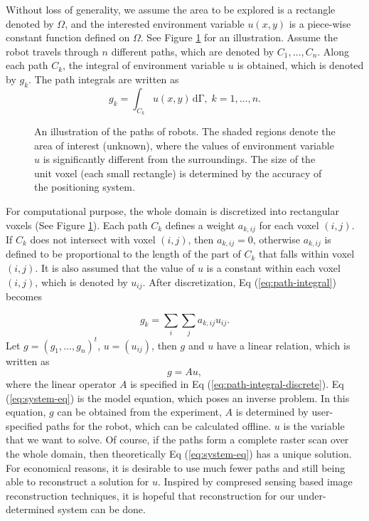 \documentclass[english]{article}\usepackage[]{graphicx}\usepackage[]{color}
\begin{document}
Without loss of generality, we assume the area to be explored is a
rectangle denoted by $\Omega$, and the interested environment variable
$u(x,y)$ is a piece-wise constant function defined on $\Omega$.
See Figure \ref{fig:An-illustration-of-paths} for an illustration.
Assume the robot travels through $n$ different paths, which are denoted
by $C_{1},\ldots,C_{n}$. Along each path $C_{k}$, the integral of
environment variable $u$ is obtained, which is denoted by $g_{k}$.
The path integrals are written as
\begin{equation}
g_{k}=\int_{C_{k}}u(x,y)\mathrm{\,{d}\Gamma},\; k=1,\ldots,n.\label{eq:path-integral}
\end{equation}


\begin{figure}[h]
\begin{centering}
\par\end{centering}

\caption{\label{fig:An-illustration-of-paths}An illustration of the paths
of robots. The shaded regions denote the area of interest (unknown),
where the values of environment variable $u$ is significantly different
from the surroundings. The size of the unit voxel (each small rectangle)
is determined by the accuracy of the positioning system.}
\end{figure}


For computational purpose, the whole domain is discretized into rectangular
voxels (See Figure \ref{fig:An-illustration-of-paths}). Each path
$C_{k}$ defines a weight $a_{k,ij}$ for each voxel $(i,j)$. If
$C_{k}$ does not intersect with voxel $(i,j)$, then $a_{k,ij}=0$,
otherwise $a_{k,ij}$ is defined to be proportional to the length
of the part of $C_{k}$ that falls within voxel $(i,j)$. It is also
assumed that the value of $u$ is a constant within each voxel $(i,j)$,
which is denoted by $u_{ij}$. After discretization, Eq (\ref{eq:path-integral})
becomes

\begin{equation}
g_{k}=\sum_{i}\sum_{j}a_{k,ij}u_{ij}.\label{eq:path-integral-discrete}
\end{equation}
Let $g=(g_{1},\ldots,g_{n})^{t}$, $u=(u_{ij})$, then $g$ and $u$
have a linear relation, which is written as 
\begin{equation}
g=Au,\label{eq:system-eq}
\end{equation}
where the linear operator $A$ is specified in Eq (\ref{eq:path-integral-discrete}).
Eq (\ref{eq:system-eq}) is the model equation, which poses an inverse
problem. In this equation, $g$ can be obtained from the experiment,
$A$ is determined by user-specified paths for the robot, which can
be calculated offline. $u$ is the variable that we want to solve.
Of course, if the paths form a complete raster scan over the whole
domain, then theoretically Eq (\ref{eq:system-eq}) has a unique solution.
For economical reasons, it is desirable to use much fewer paths and
still being able to reconstruct a solution for $u$. Inspired by compresed
sensing based image reconstruction techniques, it is hopeful that
reconstruction for our under-determined system can be done.
\end{document}
